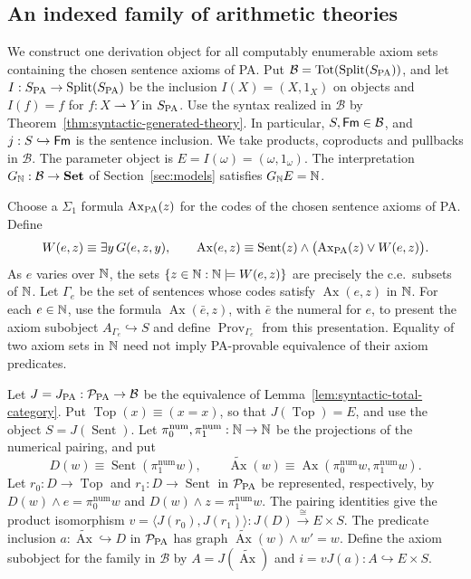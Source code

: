 \subsection{An indexed family of arithmetic theories}
\label{subsec:indexed-arithmetic-theories}

We construct one derivation object for all computably enumerable
axiom sets containing the chosen sentence axioms of PA. Put
$\mathcal B=\operatorname{Tot}(\operatorname{Split}(S_{\mathrm{PA}}))$, and let
$I:S_{\mathrm{PA}}\to\operatorname{Split}(S_{\mathrm{PA}})$ be the inclusion
$I(X)=(X,1_X)$ on objects and $I(f)=f$ for
$f:X\rightharpoonup Y$ in $S_{\mathrm{PA}}$.
Use the syntax realized in $\mathcal B$ by
Theorem~\ref{thm:syntactic-generated-theory}. In particular,
$S,\mathsf{Fm}\in\mathcal B$, and $j:S\hookrightarrow\mathsf{Fm}$ is the
sentence inclusion. We take products, coproducts and pullbacks in
$\mathcal B$.
The parameter object is $E=I(\omega)=(\omega,1_\omega)$.
The interpretation $G_{\mathbb N}:\mathcal B\to\mathbf{Set}$ of
Section~\ref{sec:models} satisfies $G_{\mathbb N}E=\mathbb N$.

Choose a $\Sigma_1$ formula $\operatorname{Ax}_{\mathrm{PA}}(z)$
for the codes of the chosen sentence axioms of PA. Define
\[
 W(e,z)\equiv\exists y\,G(e,z,y),\qquad
 \operatorname{Ax}(e,z)\equiv
 \operatorname{Sent}(z)\land
       \bigl(\operatorname{Ax}_{\mathrm{PA}}(z)\lor W(e,z)\bigr).
\]
As $e$ varies over $\mathbb N$, the sets
$\{z\in\mathbb N:\mathbb N\models W(e,z)\}$ are precisely the c.e.\ subsets of
$\mathbb N$. Let $\Gamma_e$ be the set of sentences whose codes
satisfy $\operatorname{Ax}(e,z)$ in $\mathbb N$.
For each $e\in\mathbb N$, use the formula $\operatorname{Ax}(\bar e,z)$,
with $\bar e$ the numeral for $e$, to present the axiom subobject
$A_{\Gamma_e}\hookrightarrow S$ and define
$\operatorname{Prov}_{\Gamma_e}$ from this presentation. Equality of two
axiom sets in $\mathbb N$ need not imply PA-provable equivalence of their
axiom predicates.

Let $J=J_{\mathrm{PA}}:\mathcal P_{\mathrm{PA}}\to\mathcal B$ be the
equivalence of Lemma~\ref{lem:syntactic-total-category}.
Put $\operatorname{Top}(x)\equiv(x=x)$, so that
$J(\operatorname{Top})=E$, and use the object
$S=J(\operatorname{Sent})$.
Let $\pi_0^{\mathrm{num}},\pi_1^{\mathrm{num}}:\mathbb N\to\mathbb N$
be the projections of the numerical pairing, and put
\[
 D(w)\equiv\operatorname{Sent}(\pi_1^{\mathrm{num}}w),\qquad
 \widetilde{\operatorname{Ax}}(w)\equiv\operatorname{Ax}
            (\pi_0^{\mathrm{num}}w,\pi_1^{\mathrm{num}}w).
\]
Let $r_0:D\to\operatorname{Top}$ and
$r_1:D\to\operatorname{Sent}$ in $\mathcal P_{\mathrm{PA}}$ be
represented, respectively, by
$D(w)\land e=\pi_0^{\mathrm{num}}w$ and
$D(w)\land z=\pi_1^{\mathrm{num}}w$.
The pairing identities give the product isomorphism
$v=\langle J(r_0),J(r_1)\rangle:J(D)\xrightarrow{\cong}E\times S$.
The predicate inclusion $a:\widetilde{\operatorname{Ax}}\hookrightarrow D$ in
$\mathcal P_{\mathrm{PA}}$ has graph $\widetilde{\operatorname{Ax}}(w)\land w'=w$.
Define the axiom subobject for the family in $\mathcal B$ by
$A=J(\widetilde{\operatorname{Ax}})$ and $i=vJ(a):A\hookrightarrow E\times S$.

